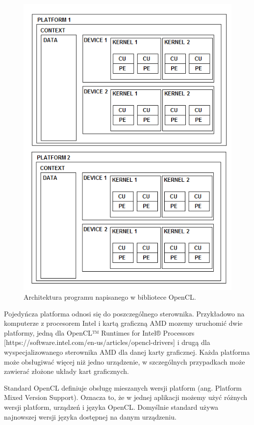 \begin{figure}[h]
        \centering
                \centering
                \includegraphics[width=12cm]{rys8}
	\caption{Architektura programu napisanego w bibliotece OpenCL.}
\end{figure}

Pojedyńcza platforma odnosi się do poszczególnego sterownika. Przykładowo na komputerze z procesorem Intel i kartą graficzną AMD mozemy uruchomić dwie platformy, jedną dla OpenCL™ Runtimes for Intel® Processors [https://software.intel.com/en-us/articles/opencl-drivers] i drugą dla wyspecjalizowanego sterownika AMD dla danej karty graficznej. Każda platforma może obsługiwać więcej niż jedno urządzenie, w szczególnych przypadkach może zawierać złożone układy kart graficznych. 

Standard OpenCL definiuje obsługę mieszanych wersji platform (ang. Platform Mixed Version Support). Oznacza to, że w jednej aplikacji możemy użyć różnych wersji platform, urządzeń i języka OpenCL. Domyślnie standard używa najnowszej wersji języka dostępnej na danym urządzeniu.

